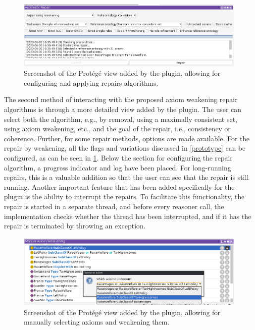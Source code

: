 \begin{figure}[ht]
  \centering
  \includegraphics[width=\textwidth]{resources/protege-repair.png}
  \caption{Screenshot of the Protégé view added by the plugin, allowing for configuring and applying repairs algorithms.}
  \label{fig:protege-repair}
\end{figure}

The second method of interacting with the proposed axiom weakening repair algorithms is through a more detailed view added by the plugin. The user can select both the algorithm, e.g., by removal, using a maximally consistent set, using axiom weakening, etc., and the goal of the repair, i.e., consistency or coherence. Further, for some repair methods, options are made available. For the repair by weakening, all the flags and variations discussed in \cref{prototype} can be configured, as can be seen in \cref{fig:protege-repair}. Below the section for configuring the repair algorithm, a progress indicator and log have been placed. For long-running repairs, this is a valuable addition so that the user can see that the repair is still running. Another important feature that has been added specifically for the plugin is the ability to interrupt the repairs. To facilitate this functionality, the repair is started in a separate thread, and before every reasoner call, the implementation checks whether the thread has been interrupted, and if it has the repair is terminated by throwing an exception.

\begin{figure}[ht]
  \centering
  \includegraphics[width=\textwidth]{resources/protege-manual.png}
  \caption{Screenshot of the Protégé view added by the plugin, allowing for manually selecting axioms and weakening them.}
  \label{fig:protege-manual}
\end{figure}

